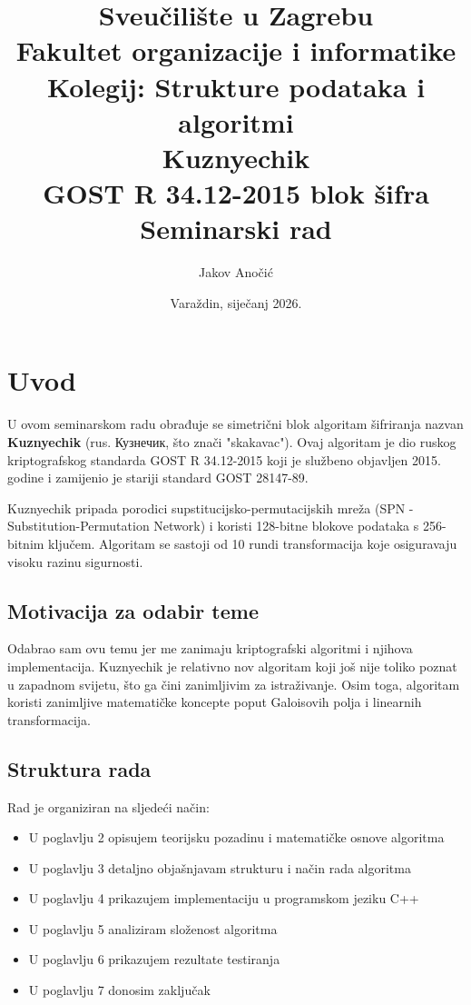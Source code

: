\documentclass[12pt,a4paper]{article}
\title{
    \vspace{-2cm}
    \textbf{Sveučilište u Zagrebu}\\
    \textbf{Fakultet organizacije i informatike}\\
    \vspace{1cm}
    \large Kolegij: Strukture podataka i algoritmi\\
    \vspace{2cm}
    \Huge \textbf{Kuznyechik}\\
    \large GOST R 34.12-2015 blok šifra\\
    \vspace{1cm}
    \large Seminarski rad
}
\author{
    \vspace{1cm}
    Jakov Anočić\\
    \vspace{0.5cm}
}
\date{Varaždin, siječanj 2026.}
\begin{document}
\maketitle
\thispagestyle{empty}
\newpage

\tableofcontents
\newpage

\newpage
\section{Uvod}

U ovom seminarskom radu obrađuje se simetrični blok algoritam šifriranja nazvan \textbf{Kuznyechik} (rus. Кузнечик, što znači "skakavac"). Ovaj algoritam je dio ruskog kriptografskog standarda GOST R 34.12-2015 koji je službeno objavljen 2015. godine i zamijenio je stariji standard GOST 28147-89.

Kuznyechik pripada porodici supstitucijsko-permutacijskih mreža (SPN - Substitution-Permutation Network) i koristi 128-bitne blokove podataka s 256-bitnim ključem. Algoritam se sastoji od 10 rundi transformacija koje osiguravaju visoku razinu sigurnosti.

\subsection{Motivacija za odabir teme}

Odabrao sam ovu temu jer me zanimaju kriptografski algoritmi i njihova implementacija. Kuznyechik je relativno nov algoritam koji još nije toliko poznat u zapadnom svijetu, što ga čini zanimljivim za istraživanje. Osim toga, algoritam koristi zanimljive matematičke koncepte poput Galoisovih polja i linearnih transformacija.

\subsection{Struktura rada}

Rad je organiziran na sljedeći način:
\begin{itemize}
    \item U poglavlju 2 opisujem teorijsku pozadinu i matematičke osnove algoritma
    \item U poglavlju 3 detaljno objašnjavam strukturu i način rada algoritma
    \item U poglavlju 4 prikazujem implementaciju u programskom jeziku C++
    \item U poglavlju 5 analiziram složenost algoritma
    \item U poglavlju 6 prikazujem rezultate testiranja
    \item U poglavlju 7 donosim zaključak
\end{itemize}
\end{document}
